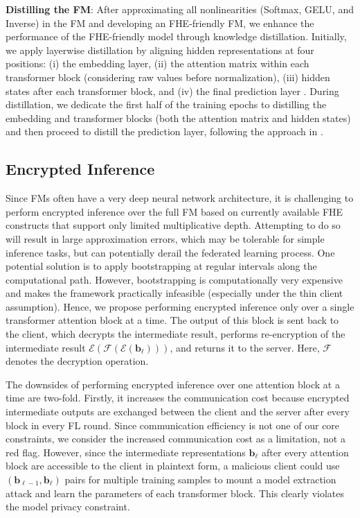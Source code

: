 \noindent \textbf{Distilling the FM}: After approximating all nonlinearities (Softmax, GELU, and Inverse) in the FM and developing an FHE-friendly FM, we enhance the performance of the FHE-friendly model through knowledge distillation. Initially, we apply layerwise distillation by aligning hidden representations at four positions: (i) the embedding layer, (ii) the attention matrix within each transformer block (considering raw values before normalization), (iii) hidden states after each transformer block, and (iv) the final prediction layer \cite{jiao2019tinybert, hinton2015distilling, li2022mpcformer}. During distillation, we dedicate the first half of the training epochs to distilling the embedding and transformer blocks (both the attention matrix and hidden states) and then proceed to distill the prediction layer, following the approach in \cite{jiao2019tinybert}. 



\subsection{Encrypted Inference}
\label{subsec:EncryptedInference}

Since FMs often have a very deep neural network architecture, it is challenging to perform encrypted inference over the full FM based on currently available FHE constructs that support only limited multiplicative depth. Attempting to do so will result in large approximation errors, which may be tolerable for simple inference tasks, but can potentially derail the federated learning process. One potential solution is to apply bootstrapping at regular intervals along the computational path. However, bootstrapping is computationally very expensive and makes the framework practically infeasible (especially under the thin client assumption). Hence, we propose performing encrypted inference only over a single transformer attention block at a time. The output of this block is sent back to the client, which decrypts the intermediate result, performs re-encryption of the intermediate result $\mathcal{E}(\mathcal{F}(\mathcal{E}(\mathbf{b}_{\ell})))$, and returns it to the server. Here, $\mathcal{F}$ denotes the decryption operation. 

The downsides of performing encrypted inference over one attention block at a time are two-fold. Firstly, it increases the communication cost because encrypted intermediate outputs are exchanged between the client and the server after every block in every FL round. Since communication efficiency is not one of our core constraints, we consider the increased communication cost as a limitation, not a red flag. However, since the intermediate representations $\mathbf{b}_{\ell}$ after every attention block are accessible to the client in plaintext form, a malicious client could use $(\mathbf{b}_{\ell-1},\mathbf{b}_{\ell})$ pairs for multiple training samples to mount a model extraction attack \cite{liang2024model} and learn the parameters of each transformer block. This clearly violates the model privacy constraint. 


